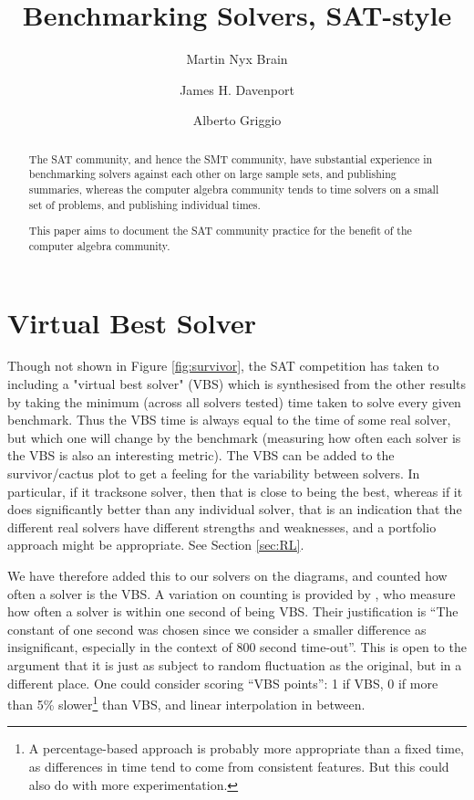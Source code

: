 \documentclass{easychair}
\begin{document}
\title{Benchmarking Solvers, SAT-style}
\author{Martin Nyx Brain \and James H. Davenport \and Alberto Griggio}
\maketitle
\begin{abstract}\noindent
The SAT community, and hence the SMT community, have substantial experience in benchmarking solvers against each other on large sample sets, and publishing summaries, whereas the computer algebra community tends to time solvers on a small set of problems, and publishing individual times.
\par
This paper aims to document the SAT community practice for the benefit of the computer algebra community.
\end{abstract}

\section{Virtual Best Solver}
Though not shown in  Figure  \ref{fig:survivor}, the SAT competition has taken to including a "virtual best solver" (VBS)
which is synthesised from the other results by taking the minimum (across all solvers tested) time taken to solve every given benchmark.
Thus the VBS time is always equal to the time of some real solver, but which one will change by the benchmark (measuring how often each solver is the VBS is also an interesting metric).  The VBS can be added to the survivor/cactus plot to get a feeling for the variability between solvers. In particular, if it tracksone solver, then that is close to being the best, whereas if it does significantly better than any individual solver, that is an indication that the different real solvers have different strengths and weaknesses, and a portfolio approach might be appropriate. See Section \ref{sec:RL}.
\par
We have therefore added this to our solvers on the diagrams, and counted how often a solver is the VBS. A variation on counting is provided by \cite{Janotaetal2016a}, who measure how often a solver is within one second of being VBS. Their justification is ``The constant of one second was chosen since we consider a smaller difference as insignificant, especially in the context of 800 second time-out''.
This is open to the argument that it is just as subject to random fluctuation as the original, but in a different place. One could consider scoring ``VBS points'': 1 if VBS, 0 if more than 5\% slower\footnote{A percentage-based approach is probably more appropriate than a fixed time, as differences in time tend to come from consistent features. But this could also do with more experimentation.} than VBS, and linear  interpolation in between.
\end{document}
